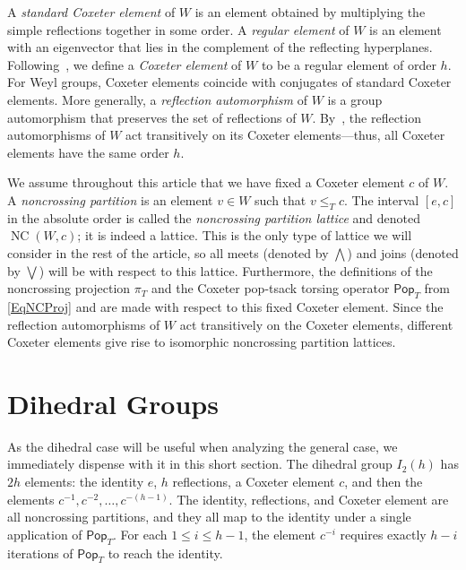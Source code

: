 \documentclass[10pt,a4paper]{amsart}
\theoremstyle{definition}
\newcommand{\darkblue}{\color{darkblue}}
\newcommand{\defn}[1]{\emph{\darkblue #1}}
\newcommand{\pop}{\mathsf{Pop}}
\DeclareMathOperator{\NC}{NC}
\begin{document}
A \defn{standard Coxeter element} of $W$ is an element obtained by multiplying the simple reflections together in some order.  A \defn{regular element} of $W$ is an element with an eigenvector that lies in the complement of the reflecting hyperplanes.  Following~\cite{reiner2017non}, we define a \defn{Coxeter element} of $W$ to be a regular element of order $h$.  For Weyl groups, Coxeter elements coincide with conjugates of standard Coxeter elements.  
More generally, a \defn{reflection automorphism} of $W$ is a group automorphism that preserves the set of reflections of $W$.  By~\cite[Proposition~1.4]{reiner2017non}, the reflection automorphisms of $W$ act transitively on its Coxeter elements---thus, all Coxeter elements have the same order $h$.

We assume throughout this article that we have fixed a Coxeter element $c$ of $W$. A \defn{noncrossing partition} is an element $v\in W$ such that $v\leq_T c$. The interval $[e,c]$ in the absolute order is called the \defn{noncrossing partition lattice} and denoted $\NC(W,c)$; it is indeed a lattice. This is the only type
of lattice we will consider in the rest of the article, so all meets (denoted by $\bigwedge$) and joins (denoted by $\bigvee$) will be with respect to this lattice. Furthermore, the definitions of the noncrossing projection $\pi_T$ and the Coxeter pop-tsack torsing operator $\pop_T$ from \eqref{EqNCProj} and  are made with respect to this 
fixed Coxeter element. Since the reflection automorphisms of $W$ act transitively on the Coxeter elements, different Coxeter elements give rise to isomorphic noncrossing partition lattices.

\section{Dihedral Groups}
\label{sec:dihedral}

As the dihedral case will be useful when analyzing the general case, we immediately dispense with it in this short section.  The dihedral group $I_2(h)$ has $2h$ elements: the identity $e$, $h$ reflections, a Coxeter element $c$, and then the elements $c^{-1},c^{-2},\ldots,c^{-(h-1)}$.  The identity, reflections, and Coxeter element are all noncrossing partitions, and they all map to the identity under a single application of $\pop_T$.  For each $1\leq i\leq h-1$, the element $c^{-i}$ requires exactly $h-i$ iterations of $\pop_T$ to reach the identity.

\setcounter{figure}{4}
\end{document}
